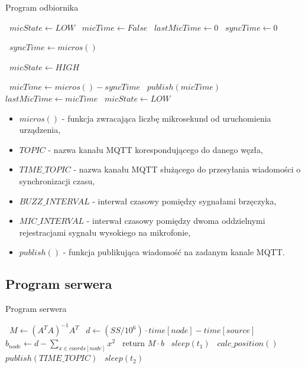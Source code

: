 \begin{algorithm}
\caption{Program odbiornika}\label{alg:sink}
\begin{algorithmic}[1]
    \State\ $micState \gets LOW$
    \State\ $micTime \gets False$
    \State\ $lastMicTime \gets 0$
    \State\ $syncTime \gets 0$

            \State\ $syncTime \gets micros()$
        \EndIf
    \EndFunction

        \State\ $micState \gets HIGH$
    \EndFunction

    \Loop
            \State\ $micTime \gets micros() - syncTime$
            \State\ $publish(micTime)$
            \State\ $lastMicTime \gets micTime$
            \State\ $micState \gets LOW$
        \EndIf
    \EndLoop
\end{algorithmic}
\end{algorithm}

\begin{itemize}
    \item $micros()$ {-} funkcja zwracająca liczbę mikrosekund od uruchomienia urządzenia,
    \item $TOPIC$ {-} nazwa kanału MQTT korespondującego do danego węzła,
    \item $TIME\_TOPIC$ {-} nazwa kanału MQTT służącego do przesyłania wiadomości o synchronizacji czasu,
    \item $BUZZ\_INTERVAL$ {-} interwał czasowy pomiędzy sygnałami brzęczyka,
    \item $ MIC\_INTERVAL$ {-} interwał czasowy pomiędzy dwoma oddzielnymi rejestracjami sygnału wysokiego na mikrofonie,
    \item $publish()$ {-} funkcja publikująca wiadomość na zadanym kanale MQTT.
\end{itemize}

\subsection{Program serwera}

\begin{algorithm}
\caption{Program serwera}\label{alg:server}
\begin{algorithmic}[1]
    \State\ $M \gets {\left(A^T A\right)}^{-1} A^T$
            \State\ $d \gets (SS / 10^{6}) \cdot time[node] - time[source]$
            \State\ $b_{node} \gets d - \sum_{x \in coords[node]}{x^2}$
        \EndFor
        \State\ return $M \cdot b$
    \EndFunction
        \State\ $sleep(t_1)$
        \State\ $calc\_position()$
    \EndLoop
        \State\ $publish(TIME\_TOPIC)$
        \State\ $sleep(t_2)$
    \EndLoop
\end{algorithmic}
\end{algorithm}

